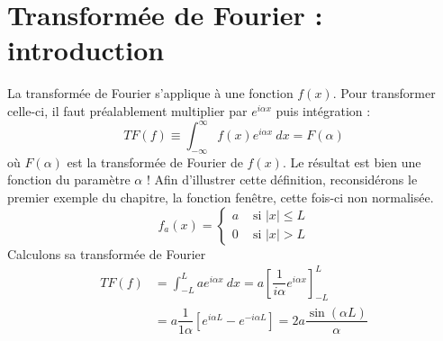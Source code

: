 \newpage
\section{Transformée de Fourier : introduction}
La transformée de Fourier s'applique à une fonction $f(x)$. Pour transformer celle-ci, il 
faut préalablement multiplier par $e^{i\alpha x}$ puis intégration :
\begin{equation}
TF(f) \equiv \int_{-\infty}^\infty f(x)e^{i\alpha x}\ dx = F(\alpha)
\end{equation}
où $F(\alpha)$ est la transformée de Fourier de $f(x)$. Le résultat est bien une fonction 
du paramètre $\alpha$ ! Afin d'illustrer cette définition, reconsidérons le premier exemple 
du chapitre, la fonction fenêtre, cette fois-ci non normalisée.
\begin{equation}
f_a(x) =\left\{\begin{array}{ll}
a &\text{ si } |x| \leq L\\
0 &\text{ si } |x| > L
\end{array}\right.
\end{equation}
Calculons sa transformée de Fourier
\begin{equation}
\begin{array}{ll}
TF(f) &= \int_{-L}^L ae^{i\alpha x}\ dx = a\left[\dfrac{1}{i\alpha}e^{i\alpha x}\right]^L_{-L}\\
&= a\dfrac{1}{1\alpha}\left[e^{i\alpha L}-e^{-i\alpha L}\right] = 2a\dfrac{\sin(\alpha L)}{\alpha}
\end{array}
\end{equation}

